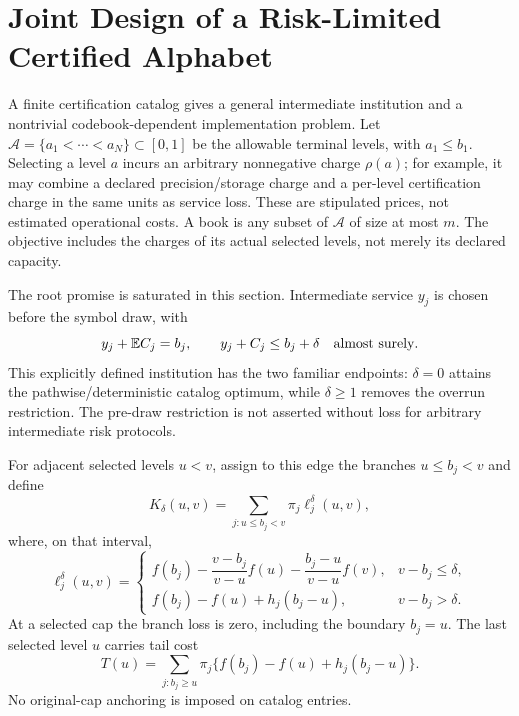 \section{Joint Design of a Risk-Limited Certified Alphabet}\label{sec:catalog}
A finite certification catalog gives a general intermediate institution and a nontrivial codebook-dependent implementation problem. Let $\mathcal A=\{a_1<\cdots<a_N\}\subset[0,1]$ be the allowable terminal levels, with $a_1\leq b_1$. Selecting a level $a$ incurs an arbitrary nonnegative charge $\rho(a)$; for example, it may combine a declared precision/storage charge and a per-level certification charge in the same units as service loss. These are stipulated prices, not estimated operational costs. A book is any subset of $\mathcal A$ of size at most $m$. The objective includes the charges of its actual selected levels, not merely its declared capacity.

The root promise is saturated in this section. Intermediate service $y_j$ is chosen before the symbol draw, with
\begin{equation}\label{eq:r37-overrun}
 y_j+\mathbb E C_j=b_j,\qquad y_j+C_j\leq b_j+\delta\quad\text{almost surely}.
\end{equation} This explicitly defined institution has the two familiar endpoints: $\delta=0$ attains the pathwise/deterministic catalog optimum, while $\delta\geq1$ removes the overrun restriction. The pre-draw restriction is not asserted without loss for arbitrary intermediate risk protocols.

For adjacent selected levels $u<v$, assign to this edge the branches $u\leq b_j<v$ and define
\begin{equation}\label{eq:catalog-edge}
 K_\delta(u,v)=\sum_{j:u\leq b_j<v}\pi_j\ell_j^\delta(u,v),
\end{equation}
where, on that interval,
\begin{equation}\label{eq:catalog-loss}
 \ell_j^\delta(u,v)=
 \begin{cases}
 f(b_j)-\dfrac{v-b_j}{v-u}f(u)-\dfrac{b_j-u}{v-u}f(v),&v-b_j\leq\delta,\\[4pt]
 f(b_j)-f(u)+h_j(b_j-u),&v-b_j>\delta.
 \end{cases}
\end{equation}
At a selected cap the branch loss is zero, including the boundary $b_j=u$. The last selected level $u$ carries tail cost
\begin{equation}\label{eq:catalog-tail}
 T(u)=\sum_{j:b_j\geq u}\pi_j\{f(b_j)-f(u)+h_j(b_j-u)\}.
\end{equation}
No original-cap anchoring is imposed on catalog entries.


